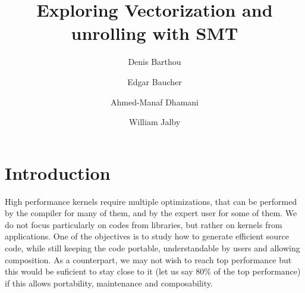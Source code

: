 \documentclass{article}
\begin{document}



\title{Exploring Vectorization and unrolling with SMT}

\author{Denis Barthou \and Edgar Baucher \and Ahmed-Manaf Dhamani \and William Jalby}



\maketitle



\section{Introduction}
High performance kernels require multiple optimizations, that can be performed by the compiler for many of them, and by the expert user for some of them. We do not
focus particularly on codes from libraries, but rather on kernels from
applications. One of the objectives is to study how to generate
efficient source code, while still keeping the code portable,
understandable by users and allowing composition. As a counterpart, we
may not wish to reach top performance but this would be suficient to
stay close to it (let us say 80\% of the top performance) if this
allows portability, maintenance and composability.
\end{document}
